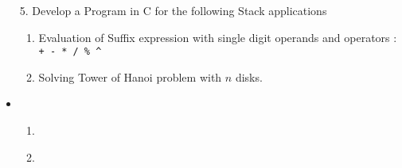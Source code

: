 \documentclass{article}
\newcommand{\answer}{\item [$\rightarrow$]}
\begin{document}
	\begin{itemize}
		\item [5.] Develop a Program in C for the following Stack applications
		\begin{enumerate}[label=\alph*.]
			\item Evaluation of Suffix expression with single digit operands and operators : \\
			\verb|+ - * / % ^|
			\item Solving Tower of Hanoi problem with $n$ disks.
		\end{enumerate}
		\answer
		\begin{enumerate}[label=\alph*.]
			\item \inputminted{c}{../../Program5.P.c}
			\item \inputminted{c}{../../Program5.H.c}
		\end{enumerate}
	\end{itemize}
\end{document}
